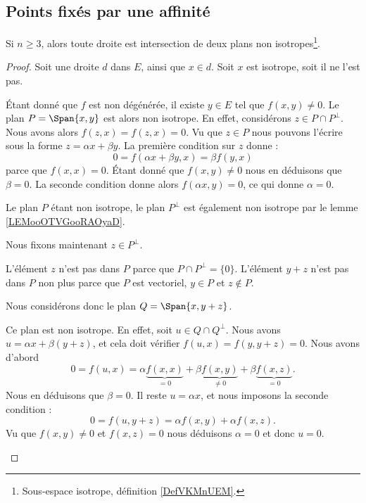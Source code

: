 \subsection{Points fixés par une affinité}

\begin{lemma}        \label{LEMooGUEGooTUXRsQ}
	Si \( n\geq 3\), alors toute droite est intersection de deux plans non isotropes\footnote{Sous-espace isotrope, définition \ref{DefVKMnUEM}.}.
\end{lemma}

\begin{proof}
	Soit une droite \( d\) dans \( E\), ainsi que \( x\in d\). Soit \( x\) est isotrope, soit il ne l'est pas.
	\begin{subproof}

		Étant donné que \( f\) est non dégénérée, il existe \( y\in E\) tel que \( f(x,y)\neq 0\). Le plan \( P=\Span\{x,y\}\) est alors non isotrope. En effet, considérons \( z\in P\cap P^{\perp}\). Nous avons alors \( f(z,x)=f(z,x)=0\). Vu que \( z\in P\) nous pouvons l'écrire sous la forme \( z=\alpha x+\beta y\). La première condition sur \( z\) donne :
		\begin{equation}
			0=f(\alpha x+\beta y,x)=\beta f(y,x)
		\end{equation}
		parce que \( f(x,x)=0\). Étant donné que \( f(x,y)\neq 0\) nous en déduisons que \( \beta=0\). La seconde condition donne alors \( f(\alpha x, y)=0\), ce qui donne \( \alpha=0\).

		Le plan \( P\) étant non isotrope, le plan \( P^{\perp}\) est également non isotrope par le lemme \ref{LEMooOTVGooRAOyaD}.

		Nous fixons maintenant \( z\in P^{\perp}\).

		L'élément \( z\) n'est pas dans \( P\) parce que \( P\cap P^{\perp}=\{ 0 \}\). L'élément \( y+z\) n'est pas dans \( P\) non plus parce que \( P\) est vectoriel, \( y\in P\) et \( z\notin P\).

		Nous considérons donc le plan \( Q=\Span\{ x,y+z \}\).

		Ce plan est non isotrope. En effet, soit \( u\in Q\cap Q^{\perp}\). Nous avons \( u=\alpha x+\beta(y+z)\), et cela doit vérifier \( f(u,x)=f(y,y+z)=0\). Nous avons d'abord
		\begin{equation}
			0=f(u,x)=\alpha \underbrace{f(x,x)}_{=0}+\beta \underbrace{f(x,y)}_{\neq 0}+\beta \underbrace{f(x,z)}_{=0}.
		\end{equation}
		Nous en déduisons que \( \beta=0\). Il reste \( u=\alpha x\), et nous imposons la seconde condition :
		\begin{equation}
			0=f(u,y+z)=\alpha f(x,y)+\alpha f(x,z).
		\end{equation}
		Vu que \( f(x,y)\neq 0\) et \( f(x,z)=0\) nous déduisons \( \alpha=0\) et donc \( u=0\).


\end{subproof}
\end{proof}
